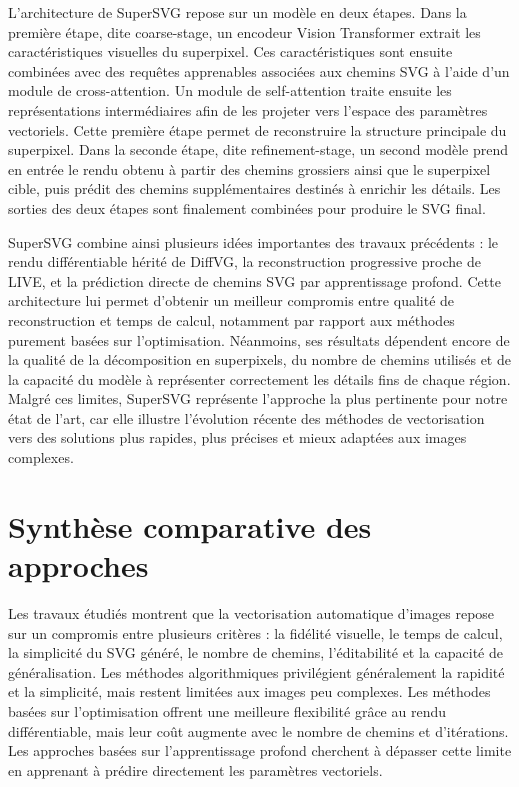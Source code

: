 \documentclass[12pt, a4paper, oneside]{report}
\begin{document}
L'architecture de SuperSVG repose sur un modèle en deux étapes. Dans la première étape, dite coarse-stage, un encodeur Vision Transformer extrait les caractéristiques visuelles du superpixel. Ces caractéristiques sont ensuite combinées avec des requêtes apprenables associées aux chemins SVG à l'aide d'un module de cross-attention. Un module de self-attention traite ensuite les représentations intermédiaires afin de les projeter vers l'espace des paramètres vectoriels. Cette première étape permet de reconstruire la structure principale du superpixel. Dans la seconde étape, dite refinement-stage, un second modèle prend en entrée le rendu obtenu à partir des chemins grossiers ainsi que le superpixel cible, puis prédit des chemins supplémentaires destinés à enrichir les détails. Les sorties des deux étapes sont finalement combinées pour produire le SVG final.

SuperSVG combine ainsi plusieurs idées importantes des travaux précédents : le rendu différentiable hérité de DiffVG, la reconstruction progressive proche de LIVE, et la prédiction directe de chemins SVG par apprentissage profond. Cette architecture lui permet d'obtenir un meilleur compromis entre qualité de reconstruction et temps de calcul, notamment par rapport aux méthodes purement basées sur l'optimisation. Néanmoins, ses résultats dépendent encore de la qualité de la décomposition en superpixels, du nombre de chemins utilisés et de la capacité du modèle à représenter correctement les détails fins de chaque région. Malgré ces limites, SuperSVG représente l'approche la plus pertinente pour notre état de l'art, car elle illustre l'évolution récente des méthodes de vectorisation vers des solutions plus rapides, plus précises et mieux adaptées aux images complexes.

\section{Synthèse comparative des approches}

Les travaux étudiés montrent que la vectorisation automatique d'images repose sur un compromis entre plusieurs critères : la fidélité visuelle, le temps de calcul, la simplicité du SVG généré, le nombre de chemins, l'éditabilité et la capacité de généralisation. Les méthodes algorithmiques privilégient généralement la rapidité et la simplicité, mais restent limitées aux images peu complexes. Les méthodes basées sur l'optimisation offrent une meilleure flexibilité grâce au rendu différentiable, mais leur coût augmente avec le nombre de chemins et d'itérations. Les approches basées sur l'apprentissage profond cherchent à dépasser cette limite en apprenant à prédire directement les paramètres vectoriels.
\end{document}
